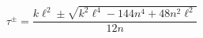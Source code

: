 \begin{equation}
\tau ^{\pm }=\frac{k\ell ^{2}\pm \sqrt{k^{2}\ell ^{4}-144n^{4}+48n^{2}\ell
^{2}}}{12n}  \label{taus}
\end{equation}%
